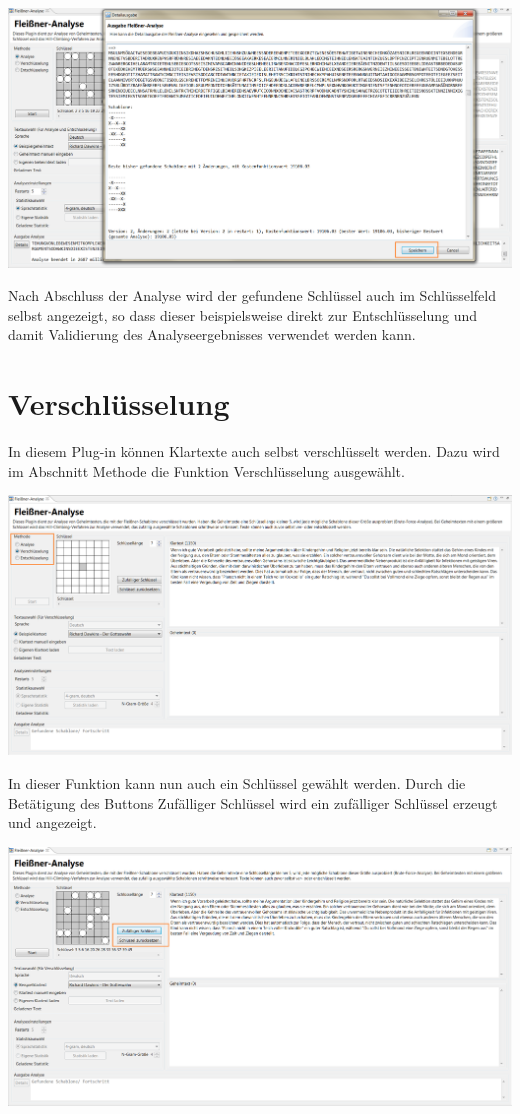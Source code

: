 \documentclass[fontsize=12pt, DIV=15, parskip=half-]{scrartcl}
\theoremstyle{break}
\begin{document}
\includegraphics[scale=0.45]{FleissnerAusgabeAnalyseGross.png}

Nach Abschluss der Analyse wird der gefundene Schlüssel auch im Schlüsselfeld selbst angezeigt, so dass dieser beispielsweise direkt zur Entschlüsselung und damit Validierung des Analyseergebnisses verwendet werden kann.
\newpage

\section{Verschlüsselung}\hypertarget{verschl}{}
In diesem Plug-in können Klartexte auch selbst verschlüsselt werden. Dazu wird im Abschnitt \glqq Methode\grqq{} die Funktion \glqq Verschlüsselung\grqq{} ausgewählt. 

\includegraphics[scale=0.45]{FleissnerEncryptSelection.png}

In dieser Funktion kann nun auch ein Schlüssel gewählt werden. Durch die Betätigung des Buttons \glqq Zufälliger Schlüssel\grqq{} wird ein zufälliger Schlüssel erzeugt und angezeigt. 

\includegraphics[scale=0.45]{FleissnerEncryptRandomKey.png}
\end{document}

